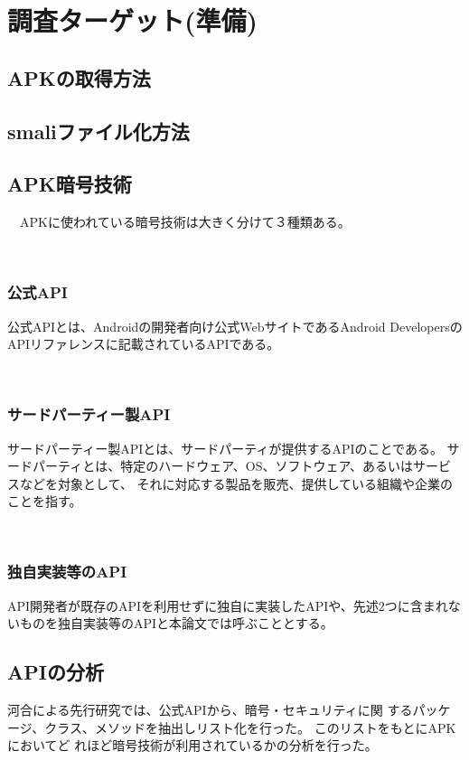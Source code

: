 \newpage

\section{調査ターゲット(準備)}
\subsection {APKの取得方法}



\subsection{smaliファイル化方法}



\subsection{APK暗号技術}
　APKに使われている暗号技術は大きく分けて３種類ある。

　\subsubsection {公式API}
公式APIとは、Androidの開発者向け公式WebサイトであるAndroid DevelopersのAPIリファレンスに記載されているAPIである。

　\subsubsection {サードパーティー製API}
サードパーティー製APIとは、サードパーティが提供するAPIのことである。
サードパーティとは、特定のハードウェア、OS、ソフトウェア、あるいはサービスなどを対象として、
それに対応する製品を販売、提供している組織や企業のことを指す。

　\subsubsection {独自実装等のAPI}
API開発者が既存のAPIを利用せずに独自に実装したAPIや、先述2つに含まれないものを独自実装等のAPIと本論文では呼ぶこととする。

\subsection{APIの分析}
河合による先行研究では、公式APIから、暗号・セキュリティに関
するパッケージ、クラス、メソッドを抽出しリスト化を行った。
このリストをもとにAPKにおいてど
れほど暗号技術が利用されているかの分析を行った。

